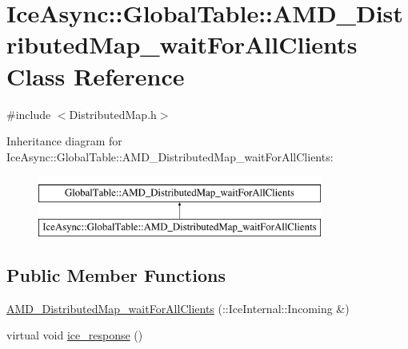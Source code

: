 \hypertarget{class_ice_async_1_1_global_table_1_1_a_m_d___distributed_map__wait_for_all_clients}{
\section{IceAsync::GlobalTable::AMD\_\-DistributedMap\_\-waitForAllClients Class Reference}
\label{class_ice_async_1_1_global_table_1_1_a_m_d___distributed_map__wait_for_all_clients}
}


{\ttfamily \#include $<$DistributedMap.h$>$}

Inheritance diagram for IceAsync::GlobalTable::AMD\_\-DistributedMap\_\-waitForAllClients:\begin{figure}[H]
\begin{center}
\leavevmode
\includegraphics[height=2cm]{class_ice_async_1_1_global_table_1_1_a_m_d___distributed_map__wait_for_all_clients}
\end{center}
\end{figure}
\subsection*{Public Member Functions}
\begin{DoxyCompactItemize}
\item 
\hyperlink{class_ice_async_1_1_global_table_1_1_a_m_d___distributed_map__wait_for_all_clients_a69c4ad387840c53dab9b3e8dee1313c6}{AMD\_\-DistributedMap\_\-waitForAllClients} (::IceInternal::Incoming \&)
\item 
virtual void \hyperlink{class_ice_async_1_1_global_table_1_1_a_m_d___distributed_map__wait_for_all_clients_adfccfd863dbf495a0f821b1b02b0893e}{ice\_\-response} ()
\end{DoxyCompactItemize}


